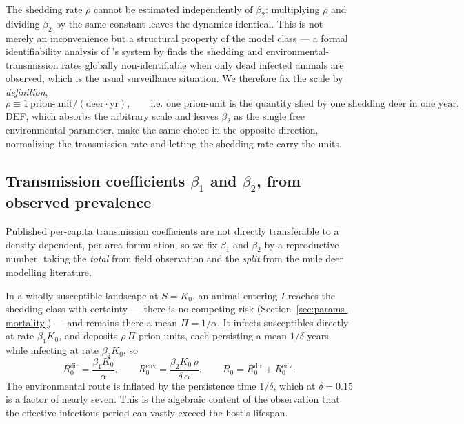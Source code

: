 \documentclass[11pt]{article}
\newcommand{\tagDEF}{{\footnotesize\textsf{\textcolor{blue!60!black}{DEF}}}}
\begin{document}
The shedding rate $\rho$ cannot be estimated independently of $\beta_2$: multiplying $\rho$ and dividing $\beta_2$ by the same constant leaves the dynamics identical. This is not merely an inconvenience but a structural property of the model class --- a formal identifiability analysis of \citeauthor{Miller2006}'s system by \citet{FitzGerald2025} finds the shedding and environmental-transmission rates globally non-identifiable when only dead infected animals are observed, which is the usual surveillance situation. We therefore fix the scale by \emph{definition},
\begin{equation}
\rho \equiv 1\ \text{prion-unit}/(\text{deer}\cdot\text{yr}),
\qquad\text{i.e.\ one prion-unit is the quantity shed by one shedding deer in one year,}
\end{equation}
\tagDEF{}, which absorbs the arbitrary scale and leaves $\beta_2$ as the single free environmental parameter. \citeauthor{FitzGerald2025} make the same choice in the opposite direction, normalizing the transmission rate and letting the shedding rate carry the units.

\subsection{Transmission coefficients $\beta_1$ and $\beta_2$, from observed prevalence}
\label{sec:params-r0}

Published per-capita transmission coefficients are not directly transferable to a density-dependent, per-area formulation, so we fix $\beta_1$ and $\beta_2$ by a reproductive number, taking the \emph{total} from field observation and the \emph{split} from the mule deer modelling literature.

In a wholly susceptible landscape at $S=K_0$, an animal entering $I$ reaches the shedding class with certainty --- there is no competing risk (Section~\ref{sec:params-mortality}) --- and remains there a mean $\Pi = 1/\alpha$. It infects susceptibles directly at rate $\beta_1 K_0$, and deposits $\rho\,\Pi$ prion-units, each persisting a mean $1/\delta$ years while infecting at rate $\beta_2 K_0$, so
\begin{equation}
R_0^{\mathrm{dir}} = \frac{\beta_1 K_0}{\alpha},
\qquad
R_0^{\mathrm{env}} = \frac{\beta_2 K_0\,\rho}{\delta\,\alpha},
\qquad
R_0 = R_0^{\mathrm{dir}} + R_0^{\mathrm{env}}.
\label{eq:R0}
\end{equation}
The environmental route is inflated by the persistence time $1/\delta$, which at $\delta = 0.15$ is a factor of nearly seven. This is the algebraic content of the observation that the effective infectious period can vastly exceed the host's lifespan.
\end{document}
